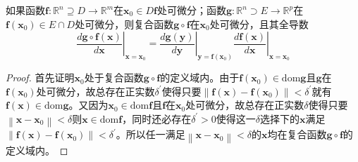 \documentclass[main.tex]{subfiles}
\begin{document}
\begin{theorem}[链式法则]
如果函数$\mathbf{f}:\mathbb{R}^n\supseteq D\rightarrow\mathbb{R}^m$在$\mathbf{x}_0\in D\mathbf{f}$处可微分；函数$\mathbf{g}:\mathbb{R}^n\supset E\rightarrow\mathbb{R}^p$在$\mathbf{f}\left(\mathbf{x}_0\right)\in E\cap D$处可微分，则复合函数$\mathbf{g}\circ\mathbf{f}$在$\mathbf{x}_0$处可微分，且其全导数
\[
\left.\frac{d\mathbf{g}\circ\mathbf{f}\left(\mathbf{x}\right)}{d\mathbf{x}}\right|_{\mathbf{x}=\mathbf{x}_0}=\left.\frac{d\mathbf{g}\left(\mathbf{y}\right)}{d\mathbf{y}}\right|_{\mathbf{y}=\mathbf{f}\left(\mathbf{x}_0\right)}\left.\frac{d\mathbf{f}\left(\mathbf{x}\right)}{d\mathbf{x}}\right|_{\mathbf{x}=\mathbf{x}_0}
\]
\end{theorem}
\begin{proof}
首先证明$\mathbf{x}_0$处于复合函数$\mathbf{g}\circ\mathbf{f}$的定义域内。由于$\mathbf{f}\left(\mathbf{x}_0\right)\in\mathrm{dom}\mathbf{g}$且$\mathbf{g}$在$\mathbf{f}\left(\mathbf{x}_0\right)$处可微分，故总存在正实数$\delta^\prime$使得只要$\left\|\mathbf{f}\left(\mathbf{x}\right)-\mathbf{f}\left(\mathbf{x}_0\right)\right\|<\delta^\prime$就有$\mathbf{f}\left(\mathbf{x}\right)\in\mathrm{dom}\mathbf{g}$。又因为$\mathbf{x}_0\in\mathrm{dom}\mathbf{f}$且$\mathbf{f}$在$\mathbf{x}_0$处可微分，故总存在正实数$\delta$使得只要$\left\|\mathbf{x}-\mathbf{x}_0\right\|<\delta$则$\mathbf{x}\in\mathrm{dom}\mathbf{f}$，同时还必存在$\delta^\prime>0$使得这一$\delta$选择下的$\mathbf{x}$满足$\left\|\mathbf{f}\left(\mathbf{x}\right)-\mathbf{f}\left(\mathbf{x}_0\right)\right\|<\delta^\prime$。所以任一满足$\left\|\mathbf{x}-\mathbf{x}_0\right\|<\delta$的$\mathbf{x}$均在复合函数$\mathbf{g}\circ\mathbf{f}$的定义域内。


\end{proof}
\end{document}

